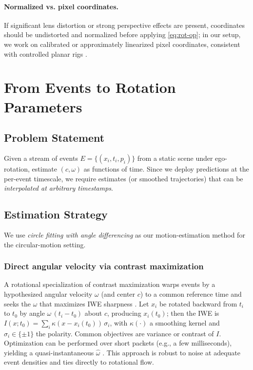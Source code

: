 \paragraph{Normalized vs. pixel coordinates.}
If significant lens distortion or strong perspective effects are present, coordinates should be undistorted and normalized before applying \eqref{eq:rot-op}; in our setup, we work on calibrated or approximately linearized pixel coordinates, consistent with controlled planar rigs \cite{Scheerlinck2021Thesis,Wang2025Thesis}.

\section{From Events to Rotation Parameters}
\subsection{Problem Statement}
Given a stream of events $E=\{(x_i,t_i,p_i)\}$ from a static scene under ego-rotation, estimate $(c,\omega)$ as functions of time. Since we deploy predictions at the per-event timescale, we require estimates (or smoothed trajectories) that can be \emph{interpolated at arbitrary timestamps}.

\subsection{Estimation Strategy}
We use \emph{circle fitting with angle differencing} as our motion-estimation method for the circular-motion setting.

\subsubsection{Direct angular velocity via contrast maximization}
A rotational specialization of contrast maximization warps events by a hypothesized angular velocity $\omega$ (and center $c$) to a common reference time and seeks the $\omega$ that maximizes IWE sharpness \cite{Gallego2017Angular,Gallego2018CMax}. Let $x_i$ be rotated backward from $t_i$ to $t_0$ by angle $\omega\,(t_i-t_0)$ about $c$, producing $x_i(t_0)$; then the IWE is $I(x;t_0) = \sum_i \kappa(x - x_i(t_0))\,\sigma_i$, with $\kappa(\cdot)$ a smoothing kernel and $\sigma_i\in\{\pm 1\}$ the polarity. Common objectives are variance or contrast of $I$. Optimization can be performed over short packets (e.g., a few milliseconds), yielding a quasi-instantaneous $\hat\omega$ \cite{Gallego2018CMax}. This approach is robust to noise at adequate event densities and ties directly to rotational flow.

